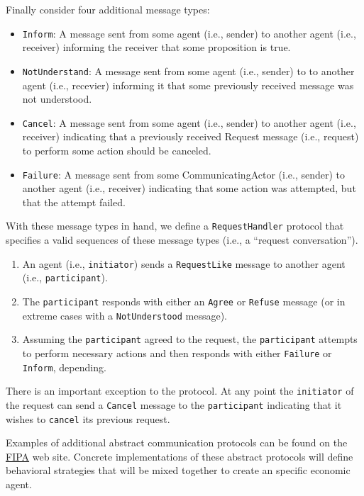 \documentclass[11pt]{amsart}
\begin{document}
Finally consider four additional message types:
\begin{itemize}
    \item \texttt{Inform}: A message sent from some agent (i.e., sender) to another agent (i.e., receiver) informing the receiver that some proposition is true.
    \item \texttt{NotUnderstand}: A message sent from some agent (i.e., sender) to to another agent (i.e., recevier) informing it that some previously received message was not understood.
    \item \texttt{Cancel}: A message sent from some agent (i.e., sender) to another agent (i.e., receiver) indicating that a previously received Request message (i.e., request) to perform some action should be canceled.
    \item \texttt{Failure}: A message sent from some CommunicatingActor (i.e., sender) to another agent (i.e., receiver) indicating that some action was attempted, but that the attempt failed.
\end{itemize}

With these message types in hand, we define a \texttt{RequestHandler} protocol that specifies a valid sequences of these message types (i.e., a ``request conversation'').
\begin{enumerate}
    \item An agent (i.e., \texttt{initiator}) sends a \texttt{RequestLike} message to another agent (i.e., \texttt{participant}).
    \item The \texttt{participant} responds with either an \texttt{Agree} or \texttt{Refuse} message (or in extreme cases with a \texttt{NotUnderstood} message).
    \item Assuming the \texttt{participant} agreed to the request, the \texttt{participant} attempts to perform necessary actions and then responds with either \texttt{Failure} or \texttt{Inform}, depending.
\end{enumerate}

There is an important exception to the protocol. At any point the \texttt{initiator} of the request can send a \texttt{Cancel} message to the \texttt{participant} indicating that it wishes to \texttt{cancel} its previous request.

Examples of additional abstract communication protocols can be found on the \href{http://www.fipa.org/repository/standardspecs.html}{FIPA} web site. Concrete implementations of these abstract protocols will define behavioral strategies that will be mixed together to create an specific economic agent.
\end{document}
